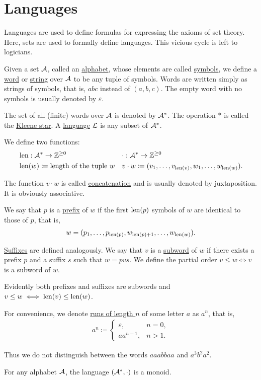 \section{Languages}\label{sec:languages}

Languages are used to define formulas for expressing the axioms of set theory. Here, sets are used to formally define languages. This vicious cycle is left to logicians.

\begin{definition}\label{def:language}
  Given a set $\mathcal A$, called an \ul{alphabet}, whose elements are called \ul{symbols}, we define a \ul{word} or \ul{string} over $\mathcal A$ to be any tuple of symbols. Words are written simply as strings of symbols, that is, $abc$ instead of $(a, b, c)$. The empty word with no symbols is usually denoted by $\varepsilon$.

  The set of all (finite) words over $\mathcal A$ is denoted by $\mathcal A^{*}$. The operation $*$ is called the \ul{Kleene star}. A \ul{language} $\mathcal L$ is any subset of $\mathcal A^{*}$.

  We define two functions:
  \begin{align*}
    &\operatorname{len}: \mathcal A^{*} \to \mathbb Z^{\geq 0}
    &&\cdot: \mathcal A^{*} \to \mathbb Z^{\geq 0}
    \\
    &\operatorname{len}(w) \coloneqq \text{length of the tuple } w
    &&v \cdot w \coloneqq (v_1, \ldots, v_{\operatorname{len}(v)}, w_1, \ldots, w_{\operatorname{len}(w)}).
  \end{align*}

  The function $v \cdot w$ is called \ul{concatenation} and is usually denoted by juxtaposition. It is obviously associative.

  We say that $p$ is a \ul{prefix} of $w$ if the first $\operatorname{len}(p)$ symbols of $w$ are identical to those of $p$, that is,
  \begin{align*}
    w = (p_1, \ldots, p_{\operatorname{len}(p)}, w_{\operatorname{len}(p) + 1}, \ldots, w_{\operatorname{len}(w)}).
  \end{align*}

  \ul{Suffixes} are defined analogously. We say that $v$ is a \ul{subword} of $w$ if there exists a prefix $p$ and a suffix $s$ such that $w = pvs$. We define the partial order $v \leq w \iff v$ is a subword of $w$.

  Evidently both prefixes and suffixes are subwords and $v \leq w \iff \operatorname{len}(v) \leq \operatorname{len}(w)$.

  For convenience, we denote \ul{runs of length $n$} of some letter $a$ as $a^n$, that is,
  \begin{align*}
    a^n \coloneqq \begin{cases}
      \varepsilon, &n = 0, \\
      a a^{n-1}, &n > 1.
    \end{cases}
  \end{align*}

  Thus we do not distinguish between the words $aaabbaa$ and $a^3 b^2 a^2$.
\end{definition}

\begin{proposition}\label{thm:set_of_all_words_is_monoid}
  For any alphabet $\mathcal A$, the language $(\mathcal A^{*}, \cdot)$ is a monoid.
\end{proposition}
